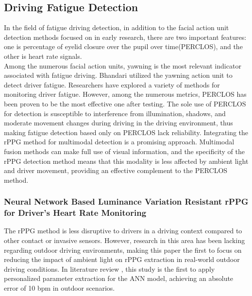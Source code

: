 \documentclass[a4paper]{article}
\begin{document}
\subsection{Driving Fatigue Detection}
In the field of fatigue driving detection, in addition to the facial action unit detection methods focused on in early research, there are two important features: one is percentage of eyelid closure over the pupil over time(PERCLOS), and the other is heart rate signals.
\\Among the numerous facial action units, yawning is the most relevant indicator associated with fatigue driving. Bhandari utilized the yawning action unit to detect driver fatigue\cite{bamidele2019non}.
Researchers have explored a variety of methods for monitoring driver fatigue. However, among the numerous metrics, PERCLOS has been proven to be the most effective one after testing.
The sole use of PERCLOS for detection is susceptible to interference from illumination, shadows, and moderate movement changes during driving in the driving environment, thus making fatigue detection based only on PERCLOS lack reliability. Integrating the rPPG method for multimodal detection is a promising approach. Multimodal fusion methods can make full use of visual information, and the specificity of the rPPG detection method means that this modality is less affected by ambient light and driver movement, providing an effective complement to the PERCLOS method.

\subsubsection{Neural Network Based Luminance Variation Resistant rPPG for Driver’s Heart Rate Monitoring}
The rPPG method is less disruptive to drivers in a driving context compared to other contact or invasive sensors. However, research in this area has been lacking regarding outdoor driving environments, making this paper the first to focus on reducing the impact of ambient light on rPPG extraction in real-world outdoor driving conditions. In literature review \cite{wu2019neural}, this study is the first to apply personalized parameter extraction for the ANN model, achieving an absolute error of 10 bpm in outdoor scenarios. 
\end{document}
